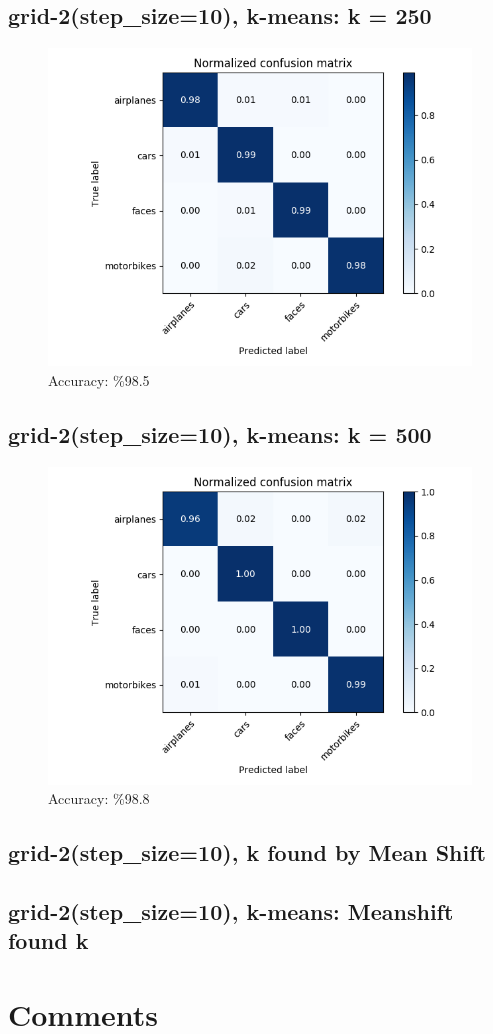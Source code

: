 \subsection*{grid-2(step\_size=10), k-means: k = 250}
\begin{figure}[H]
    \centering
    \includegraphics[width=\textwidth]{images/confusion-stp-10-250.png}
    \caption*{Accuracy: \%98.5}
\end{figure}

\subsection*{grid-2(step\_size=10), k-means: k = 500}
\begin{figure}[H]
    \centering
    \includegraphics[width=\textwidth]{images/confusion-stp-10-500.png}
    \caption*{Accuracy: \%98.8}
\end{figure}

\subsection*{grid-2(step\_size=10), k found by Mean Shift}
\subsection*{grid-2(step\_size=10), k-means: Meanshift found k}

\section*{Comments}

